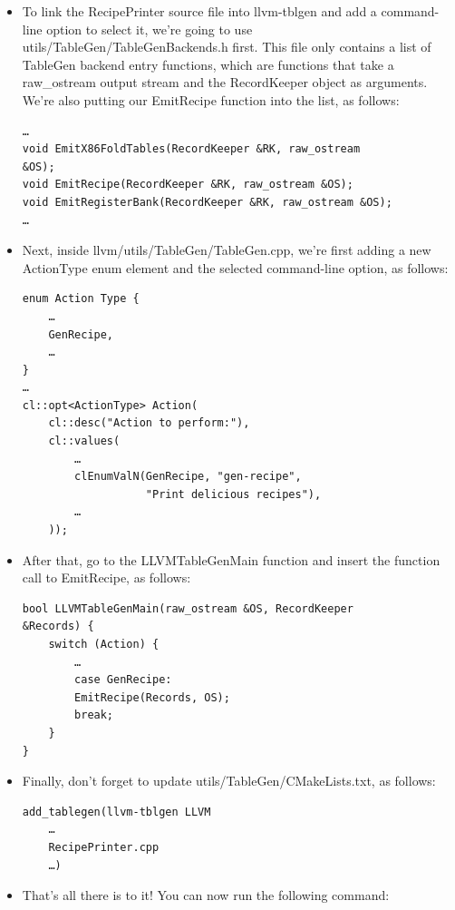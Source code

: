 \begin{itemize}
\item To link the RecipePrinter source file into llvm-tblgen and add a command-line option to select it, we're going to use utils/TableGen/TableGenBackends.h first. This file only contains a list of TableGen backend entry functions, which are functions that take a raw\_ostream output stream and the RecordKeeper object as arguments. We're also putting our EmitRecipe function into the list, as follows:

\begin{lstlisting}[style=styleCXX]
…
void EmitX86FoldTables(RecordKeeper &RK, raw_ostream
&OS);
void EmitRecipe(RecordKeeper &RK, raw_ostream &OS);
void EmitRegisterBank(RecordKeeper &RK, raw_ostream &OS);
…
\end{lstlisting}

\item Next, inside llvm/utils/TableGen/TableGen.cpp, we're first adding a new ActionType enum element and the selected command-line option, as follows:

\begin{lstlisting}[style=styleCXX]
enum Action Type {
	…
	GenRecipe,
	… 
} 
…
cl::opt<ActionType> Action(
	cl::desc("Action to perform:"),
	cl::values(
		…
		clEnumValN(GenRecipe, "gen-recipe",
				   "Print delicious recipes"),
		…
	));
\end{lstlisting}

\item After that, go to the LLVMTableGenMain function and insert the function call to EmitRecipe, as follows:

\begin{lstlisting}[style=styleCXX]
bool LLVMTableGenMain(raw_ostream &OS, RecordKeeper
&Records) {
	switch (Action) {
		…
		case GenRecipe:
		EmitRecipe(Records, OS);
		break;
	}
}
\end{lstlisting}

\item Finally, don't forget to update utils/TableGen/CMakeLists.txt, as follows:

\begin{lstlisting}[style=styleCXX]
add_tablegen(llvm-tblgen LLVM
	…
	RecipePrinter.cpp
	…)
\end{lstlisting}

\item That's all there is to it! You can now run the following command:



\end{itemize}
